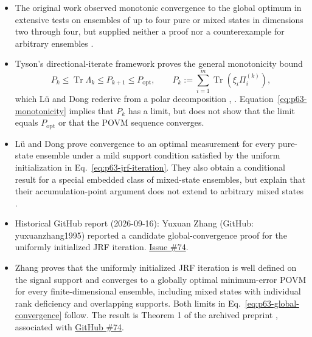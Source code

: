 \begin{itemize}
  \item The original work observed monotonic convergence to the global optimum
  in extensive tests on ensembles of up to four pure or mixed states in
  dimensions two through four, but supplied neither a proof nor a
  counterexample for arbitrary ensembles
  .

  \item Tyson's directional-iterate framework proves the general monotonicity
  bound
  \begin{equation}
    P_k\leq\operatorname{Tr}\Lambda_k
        \leq P_{k+1}\leq P_{\mathrm{opt}},
    \qquad
    P_k:=\sum_{i=1}^{m}\operatorname{Tr}(\xi_i\Pi_i^{(k)}),
    \label{eq:p63-monotonicity}
  \end{equation}
  which L\"u and Dong rederive from a polar decomposition
  ,
  .  Equation~\eqref{eq:p63-monotonicity}
  implies that $P_k$ has a limit, but does not show that the limit equals
  $P_{\mathrm{opt}}$ or that the POVM sequence converges.

  \item L\"u and Dong prove convergence to an optimal measurement for every
  pure-state ensemble under a mild support condition satisfied by the uniform
  initialization in Eq.~\eqref{eq:p63-jrf-iteration}.  They also obtain a
  conditional result for a special embedded class of mixed-state ensembles,
  but explain that their accumulation-point argument does not extend to
  arbitrary mixed states .

  \item Historical GitHub report (2026-09-16): Yuxuan Zhang (GitHub: yuxuanzhang1995) reported a candidate global-convergence proof for the uniformly initialized JRF iteration. \href{https://github.com/Naixu-Guo/quantum-open-problems/issues/74}{Issue \#74}.

  \item Zhang proves that the uniformly initialized JRF iteration is well defined on the signal support and converges to a globally optimal minimum-error POVM for every finite-dimensional ensemble, including mixed states with individual rank deficiency and overlapping supports. Both limits in Eq.~\eqref{eq:p63-global-convergence} follow. The result is Theorem 1 of the archived preprint , associated with \href{https://github.com/Naixu-Guo/quantum-open-problems/issues/74}{GitHub \#74}.


\end{itemize}
